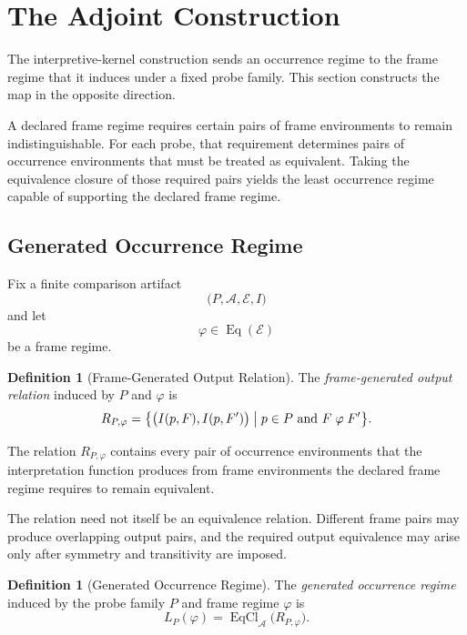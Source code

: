 \documentclass[11pt]{article}
\theoremstyle{plain}
\theoremstyle{definition}
\newtheorem{definition}[theorem]{Definition}
\theoremstyle{remark}
\begin{document}
\section{The Adjoint Construction}
\label{ik.sec.adjoint}

The interpretive-kernel construction sends an occurrence regime
to the frame regime that it induces under a fixed probe family.
This section constructs the map in the opposite direction.

A declared frame regime requires certain pairs of frame environments
to remain indistinguishable.
For each probe,
that requirement determines pairs of occurrence environments
that must be treated as equivalent.
Taking the equivalence closure of those required pairs
yields the least occurrence regime
capable of supporting the declared frame regime.

\subsection{Generated Occurrence Regime}

Fix a finite comparison artifact
\[
  \bigl(
  P,
  \mathcal{A},
  \mathcal{E},
  I
  \bigr)
\]
and let
\[
  \varphi
  \in
  \operatorname{Eq}(\mathcal{E})
\]
be a frame regime.

\begin{definition}[Frame-Generated Output Relation]
  \label{ik.def.generated-relation}
  The \emph{frame-generated output relation}
  induced by \(P\) and \(\varphi\) is
  \[
    R_{P,\varphi}
    =
    \bigl\{
    \bigl(
    I(p,F),
    I(p,F')
    \bigr)
    \bigm|
    p\in P
    \text{ and }
    F\mathrel{\varphi}F'
    \bigr\}.
  \]
\end{definition}

The relation \(R_{P,\varphi}\)
contains every pair of occurrence environments
that the interpretation function produces
from frame environments
the declared frame regime requires to remain equivalent.

The relation need not itself be an equivalence relation.
Different frame pairs may produce overlapping output pairs,
and the required output equivalence may arise only
after symmetry and transitivity are imposed.

\begin{definition}[Generated Occurrence Regime]
  \label{ik.def.generated-regime}
  The \emph{generated occurrence regime}
  induced by the probe family \(P\)
  and frame regime \(\varphi\) is
  \[
    L_P(\varphi)
    =
    \operatorname{EqCl}_{\mathcal{A}}
    \bigl(
    R_{P,\varphi}
    \bigr).
  \]
\end{definition}
\end{document}
